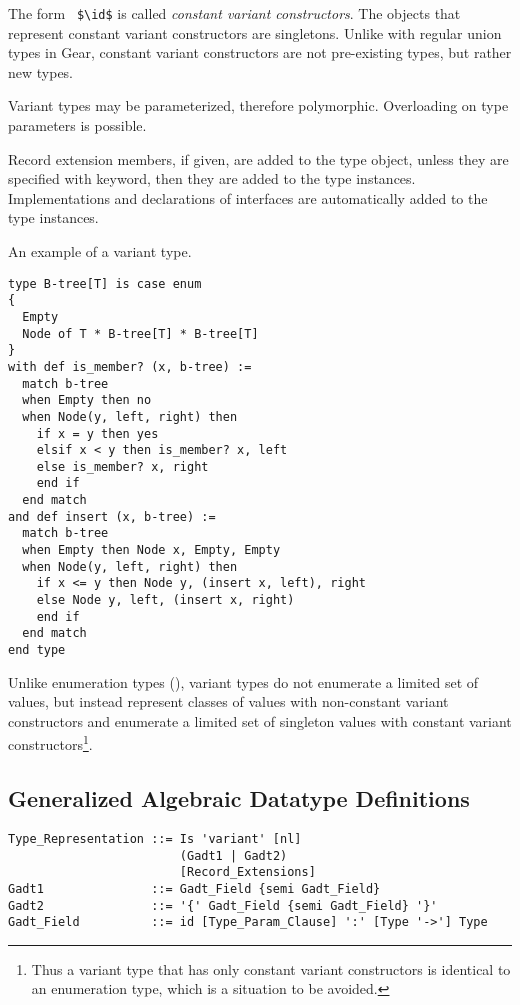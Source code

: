 The form ~\lstinline!$\id$! is called {\em constant variant constructors}. The objects that represent constant variant constructors are singletons. Unlike with regular union types in Gear, constant variant constructors are not pre-existing types, but rather new types. 

Variant types may be parameterized, therefore polymorphic. Overloading on type parameters is possible. 

Record extension members, if given, are added to the type object, unless they are specified with  keyword, then they are added to the type instances. Implementations and declarations of interfaces are automatically added to the type instances. 

\example An example of a variant type. 
\begin{lstlisting}
type B-tree[T] is case enum 
{
  Empty
  Node of T * B-tree[T] * B-tree[T]
}
with def is_member? (x, b-tree) :=
  match b-tree
  when Empty then no
  when Node(y, left, right) then
    if x = y then yes
    elsif x < y then is_member? x, left
    else is_member? x, right
    end if
  end match
and def insert (x, b-tree) := 
  match b-tree
  when Empty then Node x, Empty, Empty
  when Node(y, left, right) then
    if x <= y then Node y, (insert x, left), right
    else Node y, left, (insert x, right)
    end if
  end match
end type
\end{lstlisting}

Unlike enumeration types (), variant types do not enumerate a limited set of values, but instead represent classes of values with non-constant variant constructors and enumerate a limited set of singleton values with constant variant constructors\footnote{Thus a variant type that has only constant variant constructors is identical to an enumeration type, which is a situation to be avoided.}. 





\subsection{Generalized Algebraic Datatype Definitions}
\label{sec:gadt-types}

\syntax\begin{lstlisting}
Type_Representation ::= Is 'variant' [nl]
                        (Gadt1 | Gadt2)
                        [Record_Extensions]
Gadt1               ::= Gadt_Field {semi Gadt_Field}
Gadt2               ::= '{' Gadt_Field {semi Gadt_Field} '}'
Gadt_Field          ::= id [Type_Param_Clause] ':' [Type '->'] Type
\end{lstlisting}





